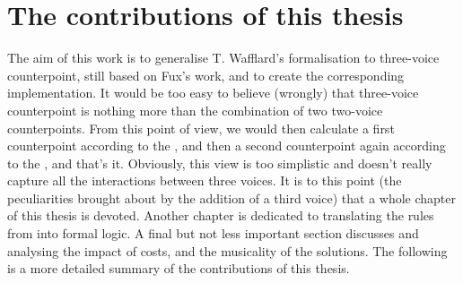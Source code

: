 \section{The contributions of this thesis}
The aim of this work is to generalise T. Wafflard's formalisation to three-voice counterpoint, still based on Fux's work, and to create the corresponding implementation. It would be too easy to believe (wrongly) that three-voice counterpoint is nothing more than the combination of two two-voice counterpoints. From this point of view, we would then calculate a first counterpoint according to the \cf, and then a second counterpoint again according to the \cf, and that's it. Obviously, this view is too simplistic and doesn't really capture all the interactions between three voices. It is to this point (the peculiarities brought about by the addition of a third voice) that a whole chapter of this thesis is devoted. Another chapter is dedicated to translating the rules from \gaps into formal logic. A final but not less important section discusses and analysing the impact of costs, and the musicality of the solutions. The following is a more detailed summary of the contributions of this thesis. 

